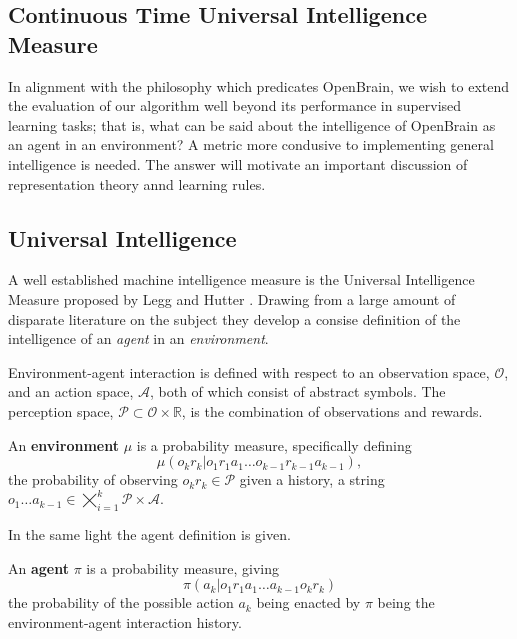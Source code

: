 \subsection{Continuous Time Universal Intelligence Measure}

In alignment with the philosophy which predicates OpenBrain, we wish to extend the evaluation of our algorithm well beyond its performance in supervised learning tasks; that is, what can be said about the intelligence of OpenBrain as an agent in an environment? A metric more condusive to implementing general intelligence is needed. The answer will motivate an important discussion of representation theory annd learning rules.
\subsection{Universal Intelligence}
A well established\cite{legg2008machine, mnih2015human, rathmanner2011philosophical}  machine intelligence measure is the Universal Intelligence Measure proposed by Legg and Hutter \cite{legg2007universal}. Drawing from a large amount of disparate literature on the subject they develop a consise definition of the intelligence of an \emph{agent} in an \emph{environment}. 

Environment-agent interaction is defined with respect to an observation space, $\mathcal{O}$, and an action space, $\mathcal{A}$, both of which consist of abstract symbols. The perception space, $\mathcal{P} \subset \mathcal{O} \times \mathbb{R}$, is the combination of observations and rewards.
\begin{definition}
	An \textbf{environment} $\mu$ is a probability measure, specifically defining
	\begin{equation}
			\mu(o_kr_k | o_1r_1a_1 \dots o_{k-1}r_{k-1}a_{k-1}),
	\end{equation}
	the probability of observing $o_kr_k \in \mathcal{P}$ given a history, a string $o_1\dots a_{k-1} \in \bigtimes_{i=1}^k \mathcal{P} \times \mathcal{A}.$
\end{definition}

In the same light the agent definition is given.
\begin{definition}
	An \textbf{agent} $\pi$ is a probability measure, giving
	\begin{equation}
		\pi(a_k | o_1r_1a_1 \dots a_{k-1}o_kr_k)
	\end{equation}
	the probability of the possible action $a_k$ being enacted by $\pi$ being the environment-agent interaction history.
\end{definition}

